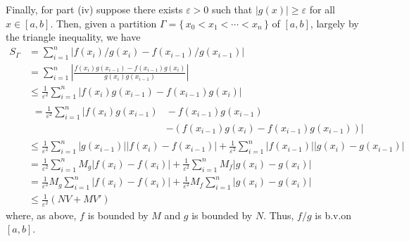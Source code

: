 \begin{solution}
  Finally, for part (iv) suppose there exists $\varepsilon>0$ such that
  $|g(x)|\geq\varepsilon$ for all $x\in[a,b]$. Then, given a partition
  $\Gamma=\{\,x_0<x_1<\cdots<x_n\,\}$ of $[a,b]$, largely by the triangle
  inequality, we have
  \begin{align*}
    S_\Gamma
    &=\sum_{i=1}^n |f(x_i)/g(x_i)-f(x_{i-1})/g(x_{i-1})|\\
    &=\sum_{i=1}^n\left|\frac{f(x_i)g(x_{i-1})-
      f(x_{i-1})g(x_i)}{g(x_i)g(x_{i-1})}\right|\\
    &\leq\frac{1}{\varepsilon^2}\sum_{i=1}^n|f(x_i)g(x_{i-1})-f(x_{i-1})g(x_i)|\\
    &
      \begin{aligned}
        =\frac{1}{\varepsilon^2}\sum_{i=1}^n |f(x_i)g(x_{i-1}){}&{}-f(x_{i-1})g(x_{i-1})\\
        &-(f(x_{i-1})g(x_i)-f(x_{i-1})g(x_{i-1}))|
      \end{aligned}\\
    &\leq
      \frac{1}{\varepsilon^2}\sum_{i=1}^n|g(x_{i-1})||f(x_i)-f(x_{i-1})|
      +\frac{1}{\varepsilon^2}\sum_{i=1}^n|f(x_{i-1})||g(x_i)-g(x_{i-1})|\\
    &=\frac{1}{\varepsilon^2}\sum_{i=1}^nM_g|f(x_i)-f(x_{i})|
      +\frac{1}{\varepsilon^2}\sum_{i=1}^nM_f|g(x_i)-g(x_i)|\\
    &=\frac{1}{\varepsilon^2}M_g\sum_{i=1}^n|f(x_i)-f(x_{i})|
      +\frac{1}{\varepsilon^2}M_f\sum_{i=1}^n|g(x_i)-g(x_i)|\\
    &\leq\frac{1}{\varepsilon^2}(NV+MV')
  \end{align*}
  where, as above, $f$ is bounded by $M$ and $g$ is bounded by $N$. Thus,
  $f/g$ is b.v.\@ on $[a,b]$.
\end{solution}

